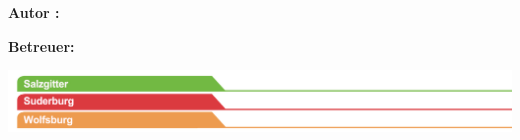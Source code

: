 \begin{titlepage}
	\vfil
	
	\hspace{1cm}
	\begin{minipage}{\dimexpr\textwidth-1.5cm\relax}
		{\Large\textsf{
			\textbf{Autor
			:} \\\documentAuthor
			}}
		
		\vspace{0.5cm}		
		
		{\Large\textsf{
			\textbf{Betreuer:} 
		}}

	\end{minipage}
	
	\vspace{2em}
	
	
	\enlargethispage{10\baselineskip}
	
	\includegraphics[scale=1.20]{./images/logos/sublogo_sz-sud-wob.jpg}
	

\end{titlepage}

\restoregeometry